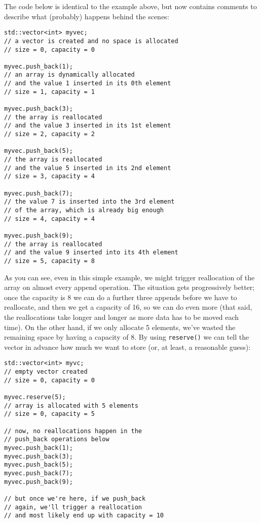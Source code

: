 \documentclass[a4paper]{scrartcl}
\begin{document}
The code below is identical to the example above, but now contains comments to describe what (probably) happens behind the scenes:

\begin{verbatim}
std::vector<int> myvec;
// a vector is created and no space is allocated
// size = 0, capacity = 0

myvec.push_back(1);
// an array is dynamically allocated
// and the value 1 inserted in its 0th element
// size = 1, capacity = 1

myvec.push_back(3);
// the array is reallocated
// and the value 3 inserted in its 1st element
// size = 2, capacity = 2

myvec.push_back(5);
// the array is reallocated
// and the value 5 inserted in its 2nd element
// size = 3, capacity = 4

myvec.push_back(7);
// the value 7 is inserted into the 3rd element
// of the array, which is already big enough
// size = 4, capacity = 4

myvec.push_back(9);
// the array is reallocated
// and the value 9 inserted into its 4th element
// size = 5, capacity = 8
\end{verbatim}

As you can see, even in this simple example, we might trigger reallocation of the array on almost every append operation. The situation gets progressively better; once the capacity is 8 we can do a further three appends before we have to reallocate, and then we get a capacity of 16, so we can do even more (that said, the reallocations take longer and longer as more data has to be moved each time). On the other hand, if we only allocate 5 elements, we've wasted the remaining space by having a capacity of 8. By using \verb|reserve()| we can tell the vector in advance how much we want to store (or, at least, a reasonable guess):

\begin{verbatim}
std::vector<int> myvc;
// empty vector created
// size = 0, capacity = 0

myvec.reserve(5);
// array is allocated with 5 elements
// size = 0, capacity = 5

// now, no reallocations happen in the
// push_back operations below
myvec.push_back(1);
myvec.push_back(3);
myvec.push_back(5);
myvec.push_back(7);
myvec.push_back(9);

// but once we're here, if we push_back
// again, we'll trigger a reallocation
// and most likely end up with capacity = 10
\end{verbatim}
\end{document}
